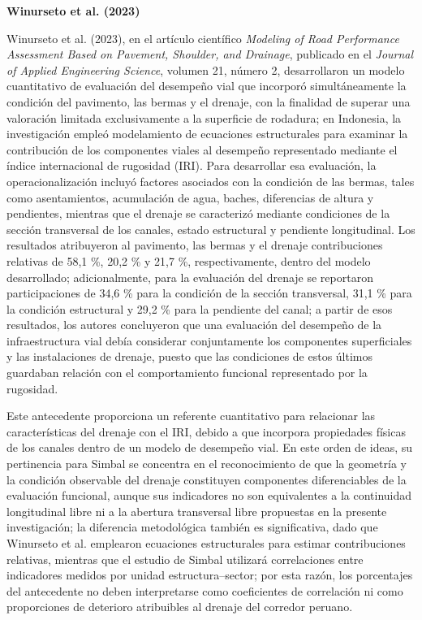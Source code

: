 \noindent\textbf{Winurseto et al. (2023)}

Winurseto et al. (2023), en el artículo científico \textit{Modeling of Road Performance Assessment Based on Pavement, Shoulder, and Drainage}, publicado en el \textit{Journal of Applied Engineering Science}, volumen 21, número 2, desarrollaron un modelo cuantitativo de evaluación del desempeño vial que incorporó simultáneamente la condición del pavimento, las bermas y el drenaje, con la finalidad de superar una valoración limitada exclusivamente a la superficie de rodadura; en Indonesia, la investigación empleó modelamiento de ecuaciones estructurales para examinar la contribución de los componentes viales al desempeño representado mediante el índice internacional de rugosidad (IRI). Para desarrollar esa evaluación, la operacionalización incluyó factores asociados con la condición de las bermas, tales como asentamientos, acumulación de agua, baches, diferencias de altura y pendientes, mientras que el drenaje se caracterizó mediante condiciones de la sección transversal de los canales, estado estructural y pendiente longitudinal. Los resultados atribuyeron al pavimento, las bermas y el drenaje contribuciones relativas de 58,1 \%, 20,2 \% y 21,7 \%, respectivamente, dentro del modelo desarrollado; adicionalmente, para la evaluación del drenaje se reportaron participaciones de 34,6 \% para la condición de la sección transversal, 31,1 \% para la condición estructural y 29,2 \% para la pendiente del canal; a partir de esos resultados, los autores concluyeron que una evaluación del desempeño de la infraestructura vial debía considerar conjuntamente los componentes superficiales y las instalaciones de drenaje, puesto que las condiciones de estos últimos guardaban relación con el comportamiento funcional representado por la rugosidad.

Este antecedente proporciona un referente cuantitativo para relacionar las características del drenaje con el IRI, debido a que incorpora propiedades físicas de los canales dentro de un modelo de desempeño vial. En este orden de ideas, su pertinencia para Simbal se concentra en el reconocimiento de que la geometría y la condición observable del drenaje constituyen componentes diferenciables de la evaluación funcional, aunque sus indicadores no son equivalentes a la continuidad longitudinal libre ni a la abertura transversal libre propuestas en la presente investigación; la diferencia metodológica también es significativa, dado que Winurseto et al. emplearon ecuaciones estructurales para estimar contribuciones relativas, mientras que el estudio de Simbal utilizará correlaciones entre indicadores medidos por unidad estructura–sector; por esta razón, los porcentajes del antecedente no deben interpretarse como coeficientes de correlación ni como proporciones de deterioro atribuibles al drenaje del corredor peruano.

